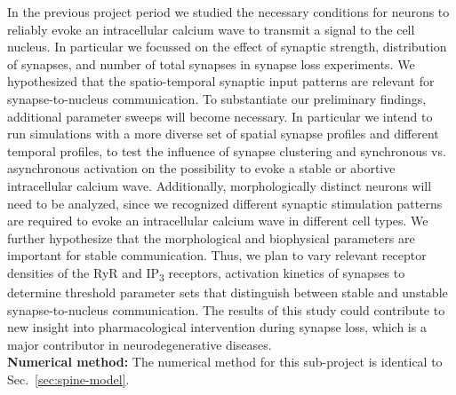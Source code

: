In the previous project period we studied the necessary conditions for neurons to reliably evoke an intracellular calcium wave to transmit a signal to the cell nucleus. In particular we focussed on the effect of synaptic strength, distribution of synapses, and number of total synapses in synapse loss experiments. We hypothesized that the spatio-temporal synaptic input patterns are relevant for synapse-to-nucleus communication. To substantiate our preliminary findings, additional parameter sweeps will become necessary. In particular we intend to run simulations with a more diverse set of spatial synapse profiles and different temporal profiles, to test the influence of synapse clustering and synchronous vs. asynchronous activation on the possibility to evoke a stable or abortive intracellular calcium wave. Additionally, morphologically distinct neurons will need to be analyzed, since we recognized different synaptic stimulation patterns are required to evoke an intracellular calcium wave in different cell types.
We further hypothesize that the morphological and biophysical parameters are important for stable communication. Thus, we plan to vary relevant receptor densities of the RyR and IP\textsubscript3 receptors, activation kinetics of synapses to determine threshold parameter sets that distinguish between stable and unstable synapse-to-nucleus communication. The results of this study could 
contribute to new insight into pharmacological intervention during synapse loss, which is a major contributor in neurodegenerative diseases. \\
\textbf{Numerical method:} The numerical method for this sub-project is identical to Sec.~\ref{sec:spine-model}. \\
